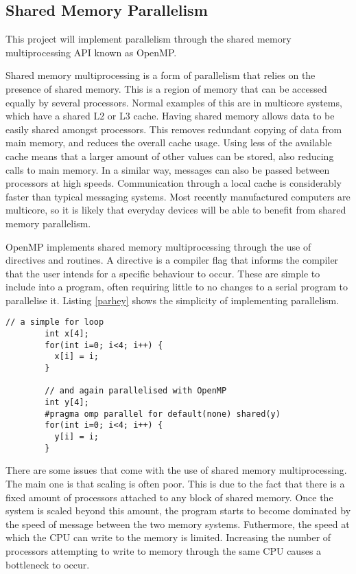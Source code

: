 \documentclass[../main.tex]{subfiles}
\begin{document}
    \subsection{Shared Memory Parallelism}
      This project will implement parallelism through the shared memory multiprocessing API known as OpenMP.
  
      Shared memory multiprocessing is a form of parallelism that relies on the presence of shared memory.
      This is a region of memory that can be accessed equally by several processors.
      Normal examples of this are in multicore systems, which have a shared L2 or L3 cache.
      Having shared memory allows data to be easily shared amongst processors.
      This removes redundant copying of data from main memory, and reduces the overall cache usage.
      Using less of the available cache means that a larger amount of other values can be stored, also reducing calls to main memory.
      In a similar way, messages can also be passed between processors at high speeds.
      Communication through a local cache is considerably faster than typical messaging systems.
      Most recently manufactured computers are multicore, so it is likely that everyday devices will be able to benefit from shared memory parallelism.

      OpenMP implements shared memory multiprocessing through the use of directives and routines.
      A directive is a compiler flag that informs the compiler that the user intends for a specific behaviour to occur.
      These are simple to include into a program, often requiring little to no changes to a serial program to parallelise it.
      Listing \ref{parhey} shows the simplicity of implementing parallelism.
      \lstset{language=C++}
      \begin{lstlisting}[caption = 'A simple loop parallelised with OpenMP', label=parhey]
        // a simple for loop
        int x[4];
        for(int i=0; i<4; i++) {
          x[i] = i;
        }

        // and again parallelised with OpenMP
        int y[4];
        #pragma omp parallel for default(none) shared(y)
        for(int i=0; i<4; i++) {
          y[i] = i;
        }
      \end{lstlisting}

      There are some issues that come with the use of shared memory multiprocessing.
      The main one is that scaling is often poor.
      This is due to the fact that there is a fixed amount of processors attached to any block of shared memory.
      Once the system is scaled beyond this amount, the program starts to become dominated by the speed of message between the two memory systems.
      Futhermore, the speed at which the CPU can write to the memory is limited.
      Increasing the number of processors attempting to write to memory through the same CPU causes a bottleneck to occur.
 
\end{document}
